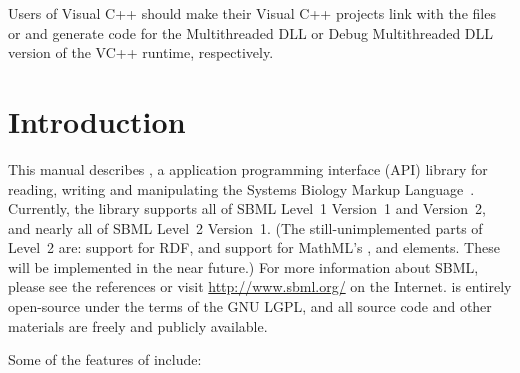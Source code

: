 \documentclass{sbmlmanual}
\begin{document}
Users of Visual C++ should make their Visual C++ projects link with the
files  or  and generate code for the
Multithreaded DLL or Debug Multithreaded DLL version of the VC++ runtime,
respectively.


\section{Introduction}
\label{sec:introduction}

This manual describes \libsbml{}, a application programming interface (API)
library for reading, writing and manipulating the Systems Biology Markup
Language~\citep[SBML;][]{hucka_2001b,hucka_2003,finney_2003b}.  Currently,
the library supports all of SBML Level~1 Version~1 and Version~2, and
nearly all of SBML Level~2 Version~1.  (The still-unimplemented parts of
Level~2 are: support for RDF, and support for MathML's ,
 and  elements.  These will be
implemented in the near future.)  For more information about SBML, please
see the references or visit \url{http://www.sbml.org/} on the Internet.
\libsbml{} is entirely open-source under the terms of the GNU LGPL, and all
source code and other materials are freely and publicly available.

Some of the features of \libsbml{} include:
\end{document}
